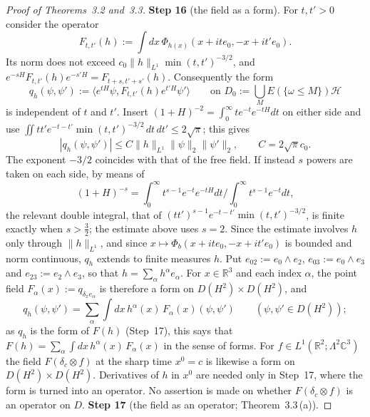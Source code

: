 \documentclass[11pt]{amsart}
\theoremstyle{definition}
\begin{document}
\begin{proof}[Proof of Theorems~3.2 and~3.3]
\textbf{Step 16} (the field as a form).
For $t,t'>0$ consider the operator
\begin{equation*}
F_{t,t'}(h):=\int dx\,\Phi_{h(x)}(x+ite_0,-x+it'e_0).
\end{equation*}
Its norm does not exceed $c_0\|h\|_{L^1}\min(t,t')^{-3/2}$, and $e^{-sH}F_{t,t'}(h)e^{-s'H}=F_{t+s,t'+s'}(h)$.
Consequently the form
\begin{equation*}
q_h(\psi,\psi'):=\langle e^{tH}\psi,F_{t,t'}(h)e^{t'H}\psi'\rangle\qquad\text{on }D_0:=\bigcup_ME(\{\omega\le M\})\mathcal H
\end{equation*}
is independent of $t$ and $t'$.
Insert $(1+H)^{-2}=\int_0^\infty te^{-t}e^{-tH}dt$ on either side and use $\iint tt'e^{-t-t'}\min(t,t')^{-3/2}\,dt\,dt'\le2\sqrt\pi$; this gives
\begin{equation*}
|q_h(\psi,\psi')|\le C\|h\|_{L^1}\|\psi\|_2\|\psi'\|_2,\qquad C=2\sqrt\pi c_0.
\end{equation*}
The exponent $-3/2$ coincides with that of the free field.
If instead $s$ powers are taken on each side, by means of
\begin{equation*}
(1+H)^{-s}=\int_0^\infty t^{s-1}e^{-t}e^{-tH}dt\Big/\int_0^\infty t^{s-1}e^{-t}dt,
\end{equation*}
the relevant double integral, that of $(tt')^{s-1}e^{-t-t'}\min(t,t')^{-3/2}$, is finite exactly when $s>\frac32$; the estimate above uses $s=2$.
Since the estimate involves $h$ only through $\|h\|_{L^1}$, and since $x\mapsto\Phi_b(x+ite_0,-x+it'e_0)$ is bounded and norm continuous, $q_h$ extends to finite measures $h$.
Put $e_{02}:=e_0\wedge e_2$, $e_{03}:=e_0\wedge e_3$ and $e_{23}:=e_2\wedge e_3$, so that $h=\sum_\alpha h^\alpha e_\alpha$.
For $x\in\mathbb R^3$ and each index $\alpha$, the point field $F_\alpha(x):=q_{\delta_xe_\alpha}$ is therefore a form on $D(H^2)\times D(H^2)$, and
\begin{equation*}
q_h(\psi,\psi')=\sum_\alpha\int dx\,h^\alpha(x)\,F_\alpha(x)(\psi,\psi')\qquad(\psi,\psi'\in D(H^2));
\end{equation*}
as $q_h$ is the form of $F(h)$ (Step~17), this says that $F(h)=\sum_\alpha\int dx\,h^\alpha(x)\,F_\alpha(x)$ in the sense of forms.
For $f\in L^1(\mathbb R^2;\Lambda^2\mathbb C^3)$ the field $F(\delta_c\otimes f)$ at the sharp time $x^0=c$ is likewise a form on $D(H^2)\times D(H^2)$.
Derivatives of $h$ in $x^0$ are needed only in Step~17, where the form is turned into an operator.
No assertion is made on whether $F(\delta_c\otimes f)$ is an operator on $D$.
\textbf{Step 17} (the field as an operator; Theorem~3.3\,(a)).

\end{proof}
\end{document}
